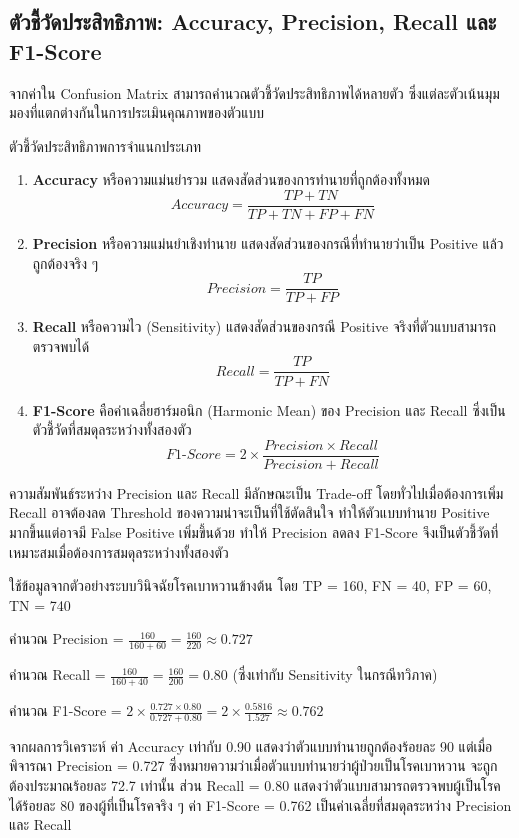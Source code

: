 \subsection{ตัวชี้วัดประสิทธิภาพ: Accuracy, Precision, Recall และ F1-Score}
จากค่าใน Confusion Matrix สามารถคำนวณตัวชี้วัดประสิทธิภาพได้หลายตัว ซึ่งแต่ละตัวเน้นมุมมองที่แตกต่างกันในการประเมินคุณภาพของตัวแบบ

\begin{myBox}[]{ตัวชี้วัดประสิทธิภาพการจำแนกประเภท}{}
\begin{enumerate}
\item \textbf{Accuracy} หรือความแม่นยำรวม แสดงสัดส่วนของการทำนายที่ถูกต้องทั้งหมด
$$Accuracy = \frac{TP + TN}{TP + TN + FP + FN}$$

\item \textbf{Precision} หรือความแม่นยำเชิงทำนาย แสดงสัดส่วนของกรณีที่ทำนายว่าเป็น Positive แล้วถูกต้องจริง ๆ
$$Precision = \frac{TP}{TP + FP}$$

\item \textbf{Recall} หรือความไว (Sensitivity) แสดงสัดส่วนของกรณี Positive จริงที่ตัวแบบสามารถตรวจพบได้
$$Recall = \frac{TP}{TP + FN}$$

\item \textbf{F1-Score} คือค่าเฉลี่ยฮาร์มอนิก (Harmonic Mean) ของ Precision และ Recall ซึ่งเป็นตัวชี้วัดที่สมดุลระหว่างทั้งสองตัว
$$F1\text{-}Score = 2 \times \frac{Precision \times Recall}{Precision + Recall}$$
\end{enumerate}
\end{myBox}

ความสัมพันธ์ระหว่าง Precision และ Recall มีลักษณะเป็น Trade-off โดยทั่วไปเมื่อต้องการเพิ่ม Recall อาจต้องลด Threshold ของความน่าจะเป็นที่ใช้ตัดสินใจ ทำให้ตัวแบบทำนาย Positive มากขึ้นแต่อาจมี False Positive เพิ่มขึ้นด้วย ทำให้ Precision ลดลง F1-Score จึงเป็นตัวชี้วัดที่เหมาะสมเมื่อต้องการสมดุลระหว่างทั้งสองตัว

\begin{exmp}
ใช้ข้อมูลจากตัวอย่างระบบวินิจฉัยโรคเบาหวานข้างต้น โดย TP = 160, FN = 40, FP = 60, TN = 740

คำนวณ Precision = $\frac{160}{160 + 60} = \frac{160}{220} \approx 0.727$ 

คำนวณ Recall = $\frac{160}{160 + 40} = \frac{160}{200} = 0.80$ (ซึ่งเท่ากับ Sensitivity ในกรณีทวิภาค)

คำนวณ F1-Score = $2 \times \frac{0.727 \times 0.80}{0.727 + 0.80} = 2 \times \frac{0.5816}{1.527} \approx 0.762$

จากผลการวิเคราะห์ ค่า Accuracy เท่ากับ 0.90 แสดงว่าตัวแบบทำนายถูกต้องร้อยละ 90 แต่เมื่อพิจารณา Precision = 0.727 ซึ่งหมายความว่าเมื่อตัวแบบทำนายว่าผู้ป่วยเป็นโรคเบาหวาน จะถูกต้องประมาณร้อยละ 72.7 เท่านั้น ส่วน Recall = 0.80 แสดงว่าตัวแบบสามารถตรวจพบผู้เป็นโรคได้ร้อยละ 80 ของผู้ที่เป็นโรคจริง ๆ ค่า F1-Score = 0.762 เป็นค่าเฉลี่ยที่สมดุลระหว่าง Precision และ Recall
\end{exmp}

